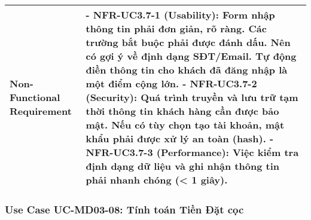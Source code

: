 \begin{longtable}{|m{4cm}|p{11cm}|}
\hline
Non-Functional Requirement & - \textbf{NFR-UC3.7-1 (Usability):} Form nhập thông tin phải đơn giản, rõ ràng. Các trường bắt buộc phải được đánh dấu. Nên có gợi ý về định dạng SĐT/Email. Tự động điền thông tin cho khách đã đăng nhập là một điểm cộng lớn. \newline - \textbf{NFR-UC3.7-2 (Security):} Quá trình truyền và lưu trữ tạm thời thông tin khách hàng cần được bảo mật. Nếu có tùy chọn tạo tài khoản, mật khẩu phải được xử lý an toàn (hash). \newline - \textbf{NFR-UC3.7-3 (Performance):} Việc kiểm tra định dạng dữ liệu và ghi nhận thông tin phải nhanh chóng (< 1 giây). \\
\hline
\end{longtable}

\subsubsection{Use Case UC-MD03-08: Tính toán Tiền Đặt cọc}

